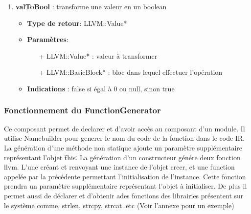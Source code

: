 \documentclass{article}
\begin{document}
\begin{enumerate}
    \item \textbf{valToBool} : transforme une valeur en un boolean
    \begin{itemize}
     \item \textbf{Type de retour}: LLVM::Value*
     \item \textbf{Paramètres}:
     \begin{enumerate}
       \item[+] LLVM::Value* : valeur à transformer
       \item[+] LLVM::BasicBlock* : bloc dans lequel effectuer l'opération
     \end{enumerate}
     \item \textbf{Indications} : false si égal à 0 ou null, sinon true
     \end{itemize}

   \end{enumerate}


   \subsubsection{Fonctionnement du FunctionGenerator}
   Ce composant permet de declarer et d'avoir accès au composant d'un module. Il utilise Namebuilder pour generer le nom du code de la fonction dans le code IR. La génération d'une méthode non statique ajoute un paramètre supplémentaire représentant l'objet \"this\". La génération d'un constructeur génére deux fonction llvm. L'une créant et renvoyant une instance de l'objet creer, et une function appelée par la précédente permettant l'initialisation de l'instance. Cette fonction prendra un paramètre supplémentaire représentant l'objet à initialiser.
   De plus il permet aussi de déclarer et d'obtenir ades fonctions des librairies présentent sur le système comme, strlen, strcpy, strcat..etc
   \small{(Voir l'annexe pour un exemple)}
\end{document}
